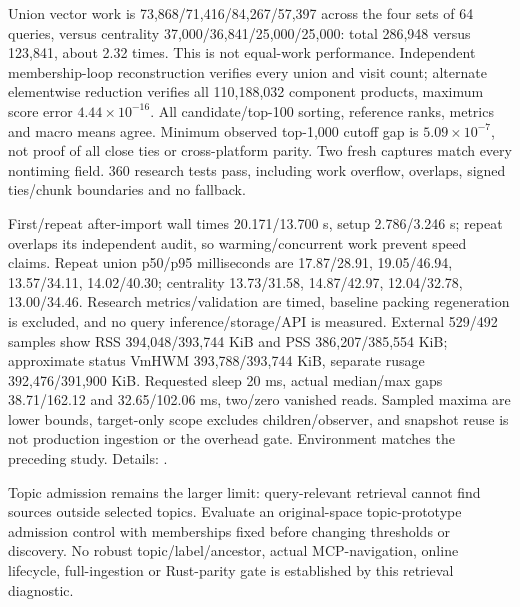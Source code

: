 \documentclass[11pt]{article}
\begin{document}
Union vector work is 73,868/71,416/84,267/57,397 across the four sets of 64
queries, versus centrality 37,000/36,841/25,000/25,000: total 286,948 versus
123,841, about 2.32 times. This is not equal-work performance. Independent
membership-loop reconstruction verifies every union and visit count; alternate
elementwise reduction verifies all 110,188,032 component products, maximum
score error $4.44\times10^{-16}$. All candidate/top-100 sorting, reference
ranks, metrics and macro means agree. Minimum observed top-1,000 cutoff gap
is $5.09\times10^{-7}$, not proof of all close ties or cross-platform parity.
Two fresh captures match every nontiming field. 360 research tests pass,
including work overflow, overlaps, signed ties/chunk boundaries and no fallback.

First/repeat after-import wall times 20.171/13.700 s, setup 2.786/3.246 s;
repeat overlaps its independent audit, so warming/concurrent work prevent speed
claims. Repeat union p50/p95 milliseconds are 17.87/28.91, 19.05/46.94,
13.57/34.11, 14.02/40.30; centrality 13.73/31.58, 14.87/42.97,
12.04/32.78, 13.00/34.46. Research metrics/validation are timed, baseline
packing regeneration is excluded, and no query inference/storage/API is measured.
External 529/492 samples show RSS 394,048/393,744 KiB and PSS
386,207/385,554 KiB; approximate status VmHWM 393,788/393,744 KiB,
separate rusage 392,476/391,900 KiB. Requested sleep 20 ms, actual median/max
gaps 38.71/162.12 and 32.65/102.06 ms, two/zero vanished reads. Sampled maxima
are lower bounds, target-only scope excludes children/observer, and snapshot
reuse is not production ingestion or the overhead gate. Environment matches
the preceding study. Details: .

Topic admission remains the larger limit: query-relevant retrieval cannot find
sources outside selected topics. Evaluate an original-space topic-prototype
admission control with memberships fixed before changing thresholds or discovery.
No robust topic/label/ancestor, actual MCP-navigation, online lifecycle,
full-ingestion or Rust-parity gate is established by this retrieval diagnostic.
\end{document}
